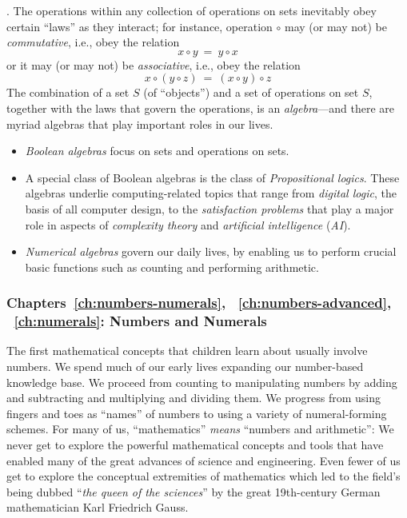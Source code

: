 \medskip

.
The operations within any collection of operations on sets inevitably obey certain ``laws'' as they interact; for instance, operation $\circ$ may (or may not) be {\em commutative}, i.e., obey the relation
\[ x \circ y \ = \ y \circ x \]
or it may (or may not) be {\em associative}, i.e., obey the relation
\[ x \circ (y \circ z) \ = \ (x \circ y) \circ z \]
The combination of a set $S$ (of ``objects'') and a set of operations on set $S$, together with the laws that govern the operations, is an {\em algebra}---and there are myriad algebras that play important roles in our lives.
\begin{itemize}
\item
{\em Boolean algebras} focus on sets and operations on sets.
\item
A special class of Boolean algebras is the class of {\em Propositional logics}.  These algebras underlie computing-related topics that range from {\em digital logic}, the basis of all computer design, to the {\em satisfaction problems} that play a major role in aspects of  {\em complexity theory} and {\em artificial intelligence} ({\em AI}).
\item
{\em Numerical algebras} govern our daily lives, by enabling us to perform crucial basic functions such as counting and performing arithmetic.
\end{itemize}


\subsubsection{Chapters~\ref{ch:numbers-numerals},
~\ref{ch:numbers-advanced}, ~\ref{ch:numerals}: Numbers and Numerals}

The first mathematical concepts that children learn about usually involve numbers.  We spend much of our early lives expanding our number-based knowledge base.  We proceed from counting to manipulating numbers by adding and subtracting and multiplying and dividing them.
We progress from using fingers and toes as ``names'' of numbers to using a variety of numeral-forming schemes.  For many of us, ``mathematics'' {\em means} ``numbers and arithmetic'': We never get to explore the powerful mathematical concepts and tools that have enabled many of the great advances of science and engineering.  Even fewer of us get to explore the conceptual extremities of mathematics which led to the field's being dubbed ``{\em the queen of the  sciences}'' by the great 19th-century German mathematician Karl Friedrich Gauss. 

